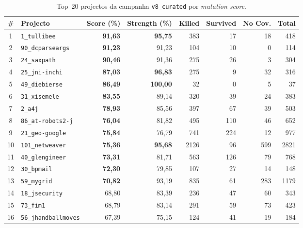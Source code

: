 \documentclass[12pt,a4paper]{article}
\begin{document}
\begin{table}[H]
  \centering
  \caption{Top~20 projectos da campanha \texttt{v8\_curated} por \textit{mutation score}.}
  \label{tab:top20}
  \footnotesize
  \begin{tabular}{clrrrrrr}
    \toprule
    \textbf{\#} & \textbf{Projecto} & \textbf{Score (\%)} & \textbf{Strength (\%)} &
    \textbf{Killed} & \textbf{Survived} & \textbf{No Cov.} & \textbf{Total} \\
    \midrule
     1 & \texttt{1\_tullibee}        & \textbf{91,63} & \textbf{95,75} &  383 &  17 &  18 &  418 \\
     2 & \texttt{90\_dcparseargs}    & \textbf{91,23} & 91,23          &  104 &  10 &   0 &  114 \\
     3 & \texttt{24\_saxpath}        & \textbf{90,46} & 91,36          &  275 &  26 &   3 &  304 \\
     4 & \texttt{25\_jni-inchi}      & \textbf{87,03} & \textbf{96,83} &  275 &   9 &  32 &  316 \\
     5 & \texttt{49\_diebierse}      & \textbf{86,49} & \textbf{100,00}&   32 &   0 &   5 &   37 \\
     6 & \texttt{31\_xisemele}       & \textbf{83,55} & 89,14          &  320 &  39 &  24 &  383 \\
     7 & \texttt{2\_a4j}             & \textbf{78,93} & 85,56          &  397 &  67 &  39 &  503 \\
     8 & \texttt{86\_at-robots2-j}   & \textbf{76,04} & 81,82          &  495 & 110 &  46 &  652 \\
     9 & \texttt{21\_geo-google}     & \textbf{75,84} & 76,79          &  741 & 224 &  12 &  977 \\
    10 & \texttt{101\_netweaver}     & \textbf{75,36} & \textbf{95,68} & 2126 &  96 & 599 & 2821 \\
    11 & \texttt{40\_glengineer}     & \textbf{73,31} & 81,71          &  563 & 126 &  79 &  768 \\
    12 & \texttt{30\_bpmail}         & \textbf{72,30} & 79,85          &  107 &  27 &  14 &  148 \\
    13 & \texttt{59\_mygrid}         & \textbf{70,82} & 93,19          &  835 &  61 & 283 & 1179 \\
    14 & \texttt{18\_jsecurity}      & 68,80          & 83,39          &  236 &  47 &  60 &  343 \\
    15 & \texttt{73\_fim1}           & 68,79          & 83,14          &  291 &  59 &  73 &  423 \\
    16 & \texttt{56\_jhandballmoves} & 67,39          & 75,15          &  124 &  41 &  19 &  184 \\

\end{tabular}
\end{table}
\end{document}

